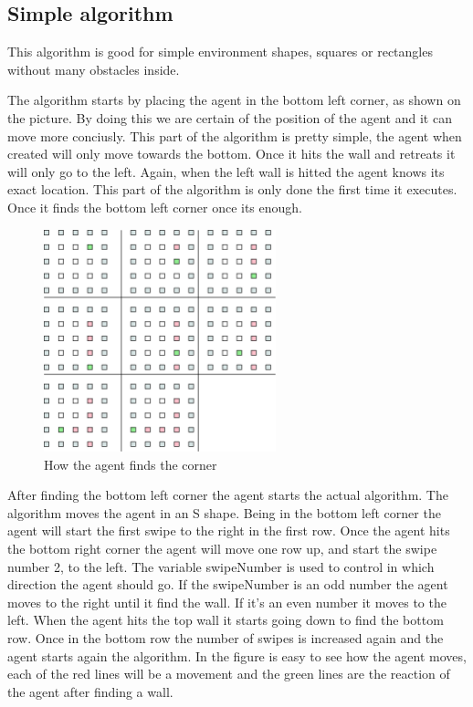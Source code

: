 \subsection{Simple algorithm}
	This algorithm is good for simple environment shapes, squares or rectangles without many obstacles inside.
	
	The algorithm starts by placing the agent in the bottom left corner, as shown on the picture. 
	By doing this we are certain of the position of the agent and it can move more conciusly.
	This part of the algorithm is pretty simple, the agent when created will only move towards the bottom.
	Once it hits the wall and retreats it will only go to the left.
	Again, when the left wall is hitted the agent knows its exact location.
	This part of the algorithm is only done the first time it executes.
	Once it finds the bottom left corner once its enough.

\begin{figure}[h] \label{fig:corner}	\centering
\includegraphics[width=0.6\textwidth]{find_corner}
\caption{How the agent finds the corner}
\end{figure}

After finding the bottom left corner the agent starts the actual algorithm. The
algorithm moves the agent in an S shape. Being in the bottom left corner the
agent will start the first swipe to the right in the first row.	Once the agent
hits the bottom right corner the agent will move one row up, and start the swipe
number 2, to the left.	The variable swipeNumber is used to control in which
direction the agent should go.	If the swipeNumber is an odd number the agent
moves to the right until it find the wall. If it's an even number it moves to
the left.	When the agent hits the top wall it starts going down to find the
bottom row.	Once in the bottom row the number of swipes is increased again and
the agent starts again the algorithm.	In the figure is easy to see how the agent
moves, each of the red lines will be a movement and the green lines are the
reaction of the agent after finding a wall.


